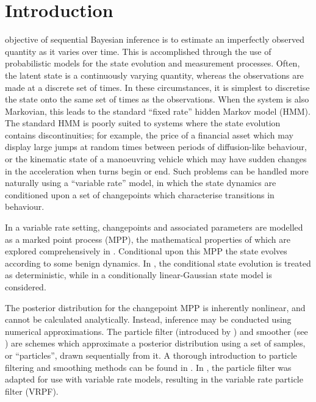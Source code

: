 \documentclass[peerreview,11pt,draftcls,onecolumn]{IEEEtran}
\begin{document}
\section{Introduction}

 objective of sequential Bayesian inference is to estimate an imperfectly observed quantity as it varies over time. This is accomplished through the use of probabilistic models for the state evolution and measurement processes. Often, the latent state is a continuously varying quantity, whereas the observations are made at a discrete set of times. In these circumstances, it is simplest to discretise the state onto the same set of times as the observations. When the system is also Markovian, this leads to the standard ``fixed rate'' hidden Markov model (HMM). The standard HMM is poorly suited to systems where the state evolution contains discontinuities; for example, the price of a financial asset which may display large jumps at random times between periods of diffusion-like behaviour, or the kinematic state of a manoeuvring vehicle which may have sudden changes in the acceleration when turns begin or end. Such problems can be handled more naturally using a ``variable rate'' model, in which the state dynamics are conditioned upon a set of changepoints which characterise transitions in behaviour.

In a variable rate setting, changepoints and associated parameters are modelled as a marked point process (MPP), the mathematical properties of which are explored comprehensively in \cite{Jacobsen2006}. Conditional upon this MPP the state evolves according to some benign dynamics. In \cite{Godsill2007,Whiteley2011}, the conditional state evolution is treated as deterministic, while in \cite{Godsill2007a,Christensen2012} a conditionally linear-Gaussian state model is considered.

The posterior distribution for the changepoint MPP is inherently nonlinear, and cannot be calculated analytically. Instead, inference may be conducted using numerical approximations. The particle filter (introduced by \cite{Gordon1993}) and smoother (see \cite{Doucet2000a,Godsill2004}) are schemes which approximate a posterior distribution using a set of samples, or ``particles'', drawn sequentially from it.  A thorough introduction to particle filtering and smoothing methods can be found in \cite{Cappe2007,Doucet2009}. In \cite{Godsill2007a,Godsill2007,Whiteley2011}, the particle filter was adapted for use with variable rate models, resulting in the variable rate particle filter (VRPF).
\end{document}
